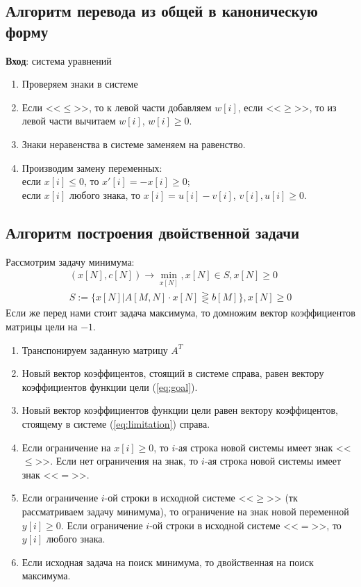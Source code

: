 \documentclass[../body.tex]{subfiles}
\begin{document}
	\subsection{Алгоритм перевода из общей в каноническую форму}
	\textbf{Вход}: система уравнений
	\begin{enumerate}
		\item Проверяем знаки в системе
		\item Если <<$\le$>>, то к левой части добавляем $w[i]$, если <<$\ge$>>, то из левой части вычитаем $w[i]$, $w[i]\ge0$.
		\item Знаки неравенства в системе заменяем на равенство.
		\item Производим замену переменных: \\если $x[i]\le0$, то $x'[i]=-x[i]\ge0$; \\если $x[i]$ любого знака, то $x[i]=u[i]-v[i]$, $v[i],u[i] \ge 0$.
	\end{enumerate}
	\subsection{Алгоритм построения двойственной задачи}
Рассмотрим задачу минимума:
	\begin{equation}
		\begin{array}{ll}\label{eq:problem}
			(x[N],c[N])\longrightarrow \min_{x[N]}, x[N] \in S, x[N] \ge 0\\
			S :=\{x[N]|A[M,N]\cdot x[N] \gtreqless b[M]\}, x[N] \ge 0
		\end{array}
	\end{equation}
	Если же перед нами стоит задача максимума, то домножим вектор коэффициентов матрицы цели на $-1$.
	\begin{enumerate}
		\item Транспонируем заданную матрицу $ A^{T}$
		\item Новый вектор коэффицентов, стоящий в системе справа, равен вектору коэффициентов функции цели (\ref{eq:goal}).
		\item Новый вектор коэффициентов функции цели равен вектору коэффицентов, стоящему в системе (\ref{eq:limitation}) справа.
		\item Если ограничение на $x[i]\ge0$, то $i$-ая строка новой системы имеет знак <<$\le$>>.
		Если нет ограничения на знак, то $i$-ая строка новой системы имеет знак <<$=$>>.
		\item Если ограничение $i$-ой строки в исходной системе <<$\ge$>> (тк рассматриваем задачу  минимума), то ограничение на знак новой переменной $y[i]\ge0$.
		Если ограничение $i$-ой строки в исходной системе <<$=$>>, то $y[i]$ любого знака.
		\item Если исходная задача на поиск минимума, то двойственная на поиск максимума.
	\end{enumerate}
\end{document}
